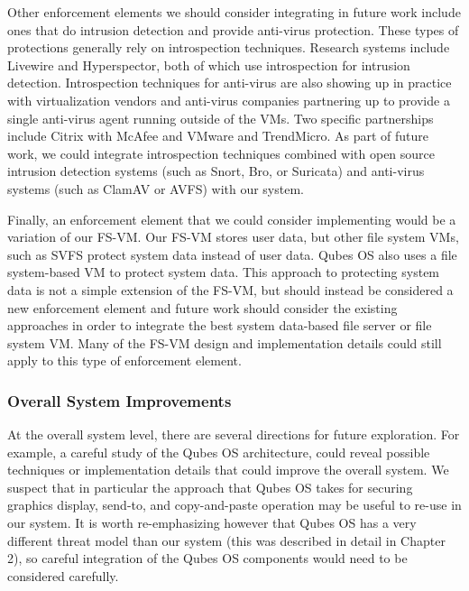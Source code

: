 Other enforcement elements we should consider integrating in future work include ones that do intrusion detection and provide anti-virus protection. These types of protections generally rely on introspection techniques. Research systems include Livewire\cite{VMI_IDS_2003} and Hyperspector\cite{HyperSpector05}, both of which use introspection for intrusion detection. Introspection techniques for anti-virus are also showing up in practice with virtualization vendors and anti-virus companies partnering up to provide a single anti-virus agent running outside of the VMs. Two specific partnerships include Citrix with McAfee\cite{citrix_mcafee_2010} and VMware and TrendMicro\cite{vmware_trendmicro_2010}. As part of future work, we could integrate introspection techniques combined with open source intrusion detection systems (such as Snort\cite{roesch_1999}, Bro\cite{paxson_1999}, or Suricata\cite{suricata_website}) and anti-virus systems (such as ClamAV\cite{clamav_website} or AVFS\cite{miretskiy_2004}) with our system.

Finally, an enforcement element that we could consider implementing would be a variation of our FS-VM. Our FS-VM stores user data, but other file system VMs, such as SVFS\cite{zhao_2005} protect system data instead of user data. Qubes OS\cite{qubes-os_2010} also uses a file system-based VM to protect system data. This approach to protecting system data is not a simple extension of the FS-VM, but should instead be considered a new enforcement element and future work should consider the existing approaches in order to integrate the best system data-based file server or file system VM. Many of the FS-VM design and implementation details could still apply to this type of enforcement element.

\subsubsection{Overall System Improvements}

At the overall system level, there are several directions for future exploration. For example, a careful study of the Qubes OS architecture, could reveal possible techniques or implementation details that could improve the overall system. We suspect that in particular the approach that Qubes OS takes for securing graphics display, send-to, and copy-and-paste operation may be useful to re-use in our system. It is worth re-emphasizing however that Qubes OS has a very different threat model than our system (this was described in detail in Chapter 2), so careful integration of the Qubes OS components would need to be considered carefully.

